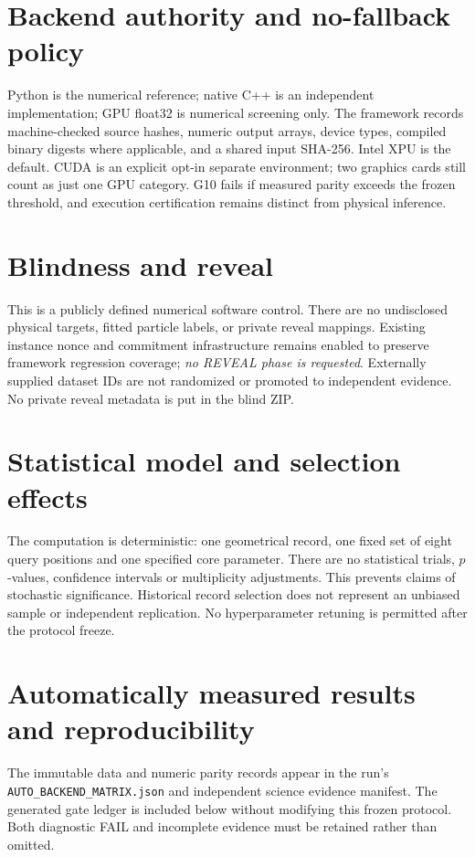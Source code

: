 \documentclass[11pt,a4paper]{article}
\begin{document}
\section{Backend authority and no-fallback policy}
Python is the numerical reference; native C++ is an independent implementation; GPU float32 is numerical screening only. The framework records machine-checked source hashes, numeric output arrays, device types, compiled binary digests where applicable, and a shared input SHA-256. Intel XPU is the default. CUDA is an explicit opt-in separate environment; two graphics cards still count as just one GPU category. G10 fails if measured parity exceeds the frozen threshold, and execution certification remains distinct from physical inference.
\section{Blindness and reveal}
This is a publicly defined numerical software control. There are no undisclosed physical targets, fitted particle labels, or private reveal mappings. Existing instance nonce and commitment infrastructure remains enabled to preserve framework regression coverage; \emph{no REVEAL phase is requested}. Externally supplied dataset IDs are not randomized or promoted to independent evidence. No private reveal metadata is put in the blind ZIP.
\section{Statistical model and selection effects}
The computation is deterministic: one geometrical record, one fixed set of eight query positions and one specified core parameter. There are no statistical trials, $p$-values, confidence intervals or multiplicity adjustments. This prevents claims of stochastic significance. Historical record selection does not represent an unbiased sample or independent replication. No hyperparameter retuning is permitted after the protocol freeze.
\section{Automatically measured results and reproducibility}
The immutable data and numeric parity records appear in the run's \texttt{AUTO\_BACKEND\_MATRIX.json} and independent science evidence manifest. The generated gate ledger is included below without modifying this frozen protocol. Both diagnostic FAIL and incomplete evidence must be retained rather than omitted.
\end{document}
